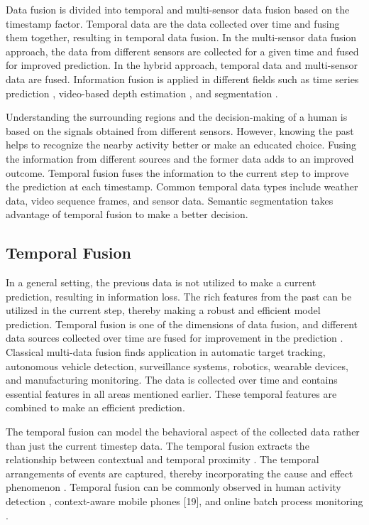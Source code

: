 	Data fusion is divided into temporal and multi-sensor data fusion based on the timestamp factor. Temporal data are the data collected over time and fusing them together, resulting in temporal data fusion. In the multi-sensor data fusion approach, the data from different sensors are collected for a given time and fused for improved prediction. In the hybrid approach, temporal data and multi-sensor data are fused. Information fusion is applied in different fields such as time series prediction \cite{02_lim2021temporal}, video-based depth estimation \cite{03_duzceker2021deepvideomvs}, and segmentation \cite{04_li2021spatial}.
	
	Understanding the surrounding regions and the decision-making of a human is based on the signals obtained from different sensors. However, knowing the past helps to recognize the nearby activity better or make an educated choice. Fusing the information from different sources and the former data adds to an improved outcome. Temporal fusion fuses the information to the current step to improve the prediction at each timestamp. Common temporal data types include weather data, video sequence frames, and sensor data. Semantic segmentation takes advantage of temporal fusion to make a better decision. 
    
    \subsection{Temporal Fusion}
	
	In a general setting, the previous data is not utilized to make a current prediction, resulting in information loss. The rich features from the past can be utilized in the current step, thereby making a robust and efficient model prediction. Temporal fusion is one of the dimensions of data fusion, and different data sources collected over time are fused for improvement in the prediction \cite{005_hsiao2005temporal}. Classical multi-data fusion finds application in automatic target tracking, autonomous vehicle detection, surveillance systems, robotics, wearable devices, and manufacturing monitoring. The data is collected over time and contains essential features in all areas mentioned earlier. These temporal features are combined to make an efficient prediction. 
    
    The temporal fusion can model the behavioral aspect of the collected data rather than just the current timestep data. The temporal fusion extracts the relationship between contextual and temporal proximity \cite{07_hsiao2005temporal}. The temporal arrangements of events are captured, thereby incorporating the cause and effect phenomenon \cite{07_hsiao2005temporal}. Temporal fusion can be commonly observed in human activity detection \cite{08_krause2003unsupervised}, context-aware mobile phones [19], and online batch process monitoring \cite{09_lee2003line}. 
    
